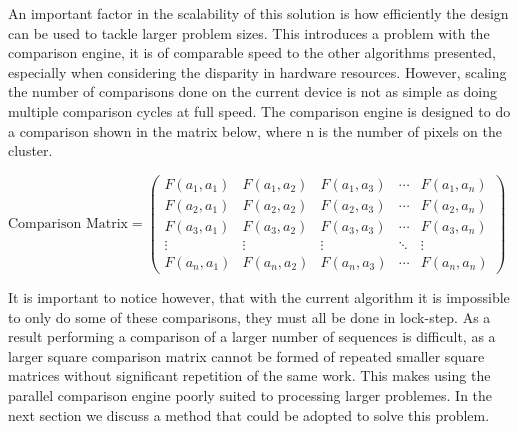 An important factor in the scalability of this solution is how efficiently the design can be used to tackle larger problem sizes. This introduces a problem with the comparison engine, it is of comparable speed to the other algorithms presented, especially when considering the disparity in hardware resources. However, scaling the number of comparisons done on the current device is not as simple as doing multiple comparison cycles at full speed. The comparison engine is designed to do a comparison shown in the matrix below, where n is the number of pixels on the cluster.
\begin{center}
$\text{Comparison Matrix} =  \begin{pmatrix}
  F(a_{1},a_{1}) & F(a_{1},a_{2}) & F(a_{1},a_{3}) & \cdots & F(a_{1},a_{n}) \\
  F(a_{2},a_{1}) & F(a_{2},a_{2}) & F(a_{2},a_{3}) & \cdots & F(a_{2},a_{n}) \\
  F(a_{3},a_{1}) & F(a_{3},a_{2}) & F(a_{3},a_{3}) & \cdots & F(a_{3},a_{n}) \\
  \vdots  & \vdots  & \vdots & \ddots & \vdots   \\
  F(a_{n},a_{1}) & F(a_{n},a_{2}) & F(a_{n},a_{3}) & \cdots & F(a_{n},a_{n})
 \end{pmatrix}
$
\end{center}

It is important to notice however, that with the current algorithm it is impossible to only do some of these comparisons, they must all be done in lock-step. As a result performing a comparison of a larger number of sequences is difficult, as a  larger square comparison matrix cannot be formed of repeated smaller square matrices without significant repetition of the same work. This makes using the parallel comparison engine poorly suited to processing larger problemes. In the next section we discuss a method that could be adopted to solve this problem. 